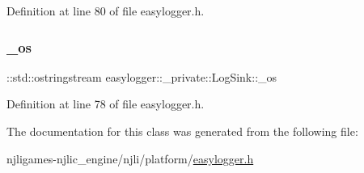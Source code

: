 Definition at line 80 of file easylogger.\+h.

\mbox{\label{classeasylogger_1_1__private_1_1_log_sink_aa75fd29fc9b5f119faf3cf98972c7992}} 
\subsubsection{\texorpdfstring{\+\_\+os}{\_os}}
{\footnotesize\ttfamily \+::std\+::ostringstream easylogger\+::\+\_\+private\+::\+Log\+Sink\+::\+\_\+os\hspace{0.3cm}{\ttfamily [private]}}



Definition at line 78 of file easylogger.\+h.



The documentation for this class was generated from the following file\+:\begin{DoxyCompactItemize}
\item 
njligames-\/njlic\+\_\+engine/njli/platform/\mbox{\hyperlink{easylogger_8h}{easylogger.\+h}}\end{DoxyCompactItemize}
